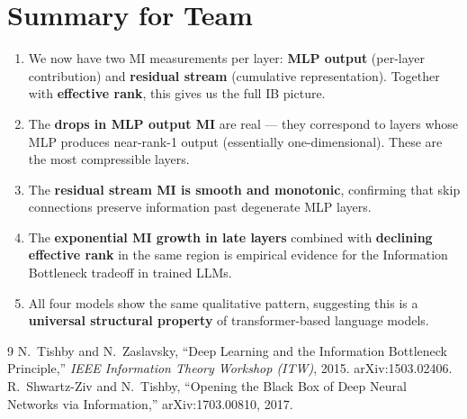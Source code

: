 \documentclass[11pt]{article}
\begin{document}
\section{Summary for Team}

\begin{enumerate}
    \item We now have two MI measurements per layer: \textbf{MLP output} (per-layer contribution) and \textbf{residual stream} (cumulative representation). Together with \textbf{effective rank}, this gives us the full IB picture.
    \item The \textbf{drops in MLP output MI} are real --- they correspond to layers whose MLP produces near-rank-1 output (essentially one-dimensional). These are the most compressible layers.
    \item The \textbf{residual stream MI is smooth and monotonic}, confirming that skip connections preserve information past degenerate MLP layers.
    \item The \textbf{exponential MI growth in late layers} combined with \textbf{declining effective rank} in the same region is empirical evidence for the Information Bottleneck tradeoff in trained LLMs.
    \item All four models show the same qualitative pattern, suggesting this is a \textbf{universal structural property} of transformer-based language models.
\end{enumerate}


\begin{thebibliography}{9}
 N.~Tishby and N.~Zaslavsky, ``Deep Learning and the Information Bottleneck Principle,'' \emph{IEEE Information Theory Workshop (ITW)}, 2015. arXiv:1503.02406.
 R.~Shwartz-Ziv and N.~Tishby, ``Opening the Black Box of Deep Neural Networks via Information,'' arXiv:1703.00810, 2017.
\end{thebibliography}
\end{document}
